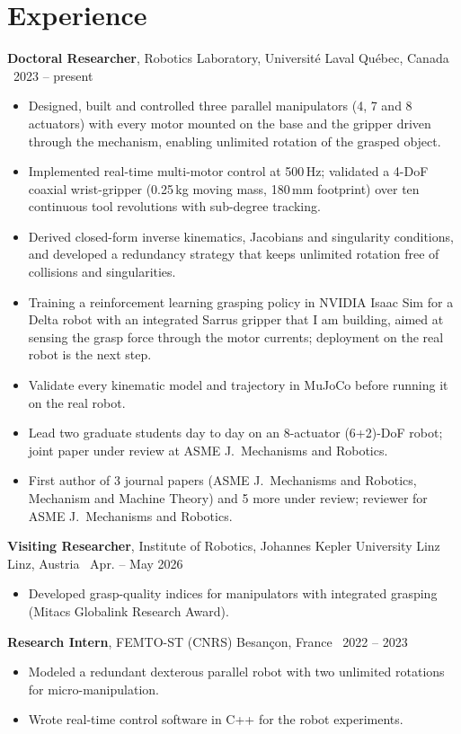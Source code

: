 \documentclass[10pt,letterpaper]{article}
\newcommand{\role}[4]{\textbf{#1}, #2 \hfill {\color{muted}#3 \textbar\ #4}\par}
\begin{document}
\section{Experience}
\role{Doctoral Researcher}{Robotics Laboratory, Universit\'e Laval}{Qu\'ebec, Canada}{2023 -- present}
\begin{itemize}
\item Designed, built and controlled three parallel manipulators (4, 7 and 8 actuators) with every motor
mounted on the base and the gripper driven through the mechanism, enabling unlimited rotation of the grasped object.
\item Implemented real-time multi-motor control at 500\,Hz; validated a 4-DoF coaxial wrist-gripper (0.25\,kg moving mass,
180\,mm footprint) over ten continuous tool revolutions with sub-degree tracking.
\item Derived closed-form inverse kinematics, Jacobians and singularity conditions, and developed a redundancy
strategy that keeps unlimited rotation free of collisions and singularities.
\item Training a reinforcement learning grasping policy in NVIDIA Isaac Sim for a Delta robot with an integrated Sarrus
gripper that I am building, aimed at sensing the grasp force through the motor currents; deployment on the real robot is
the next step.
\item Validate every kinematic model and trajectory in MuJoCo before running it on the real robot.
\item Lead two graduate students day to day on an 8-actuator (6+2)-DoF robot; joint paper under review at ASME J.\
Mechanisms and Robotics.
\item First author of 3 journal papers (ASME J.\ Mechanisms and Robotics, Mechanism and Machine Theory) and 5 more
under review; reviewer for ASME J.\ Mechanisms and Robotics.
\end{itemize}

\vspace{3pt}
\role{Visiting Researcher}{Institute of Robotics, Johannes Kepler University Linz}{Linz, Austria}{Apr. -- May 2026}
\begin{itemize}
\item Developed grasp-quality indices for manipulators with integrated grasping (Mitacs Globalink Research Award).
\end{itemize}

\vspace{3pt}
\role{Research Intern}{FEMTO-ST (CNRS)}{Besan\c{c}on, France}{2022 -- 2023}
\begin{itemize}
\item Modeled a redundant dexterous parallel robot with two unlimited rotations for micro-manipulation.
\item Wrote real-time control software in C++ for the robot experiments.
\end{itemize}
\end{document}
